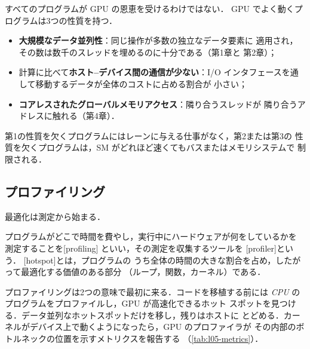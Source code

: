 \documentclass[../main.tex]{subfiles}
\begin{document}
すべてのプログラムが GPU の恩恵を受けるわけではない．
GPU でよく動くプログラムは3つの性質を持つ．
\begin{itemize}
  \item \textbf{大規模なデータ並列性}：同じ操作が多数の独立なデータ要素に
    適用され，その数は数千のスレッドを埋めるのに十分である（第1章と
    第2章）；
  \item 計算に比べて\textbf{ホスト--デバイス間の通信が少ない}：I/O
    インタフェースを通して移動するデータが全体のコストに占める割合が
    小さい；
  \item \textbf{コアレスされたグローバルメモリアクセス}：隣り合うスレッドが
    隣り合うアドレスに触れる（第4章）．
\end{itemize}
第1の性質を欠くプログラムにはレーンに与える仕事がなく，第2または第3の
性質を欠くプログラムは，SM がどれほど速くてもバスまたはメモリシステムで
制限される．

\subsection{プロファイリング}

最適化は測定から始まる．

\begin{definition}
  プログラムがどこで時間を費やし，実行中にハードウェアが何をしているかを
  測定することを[profiling]
  といい，その測定を収集するツールを
  [profiler]という．
  [hotspot]とは，プログラムの
  うち全体の時間の大きな割合を占め，したがって最適化する価値のある部分
  （ループ，関数，カーネル）である．
\end{definition}

プロファイリングは2つの意味で最初に来る．コードを移植する前には
\emph{CPU} のプログラムをプロファイルし，GPU が高速化できるホット
スポットを見つける．データ並列なホットスポットだけを移し，残りはホストに
とどめる．カーネルがデバイス上で動くようになったら，GPU のプロファイラが
その内部のボトルネックの位置を示すメトリクスを報告する
（\cref{tab:l05-metrics}）．
\end{document}
